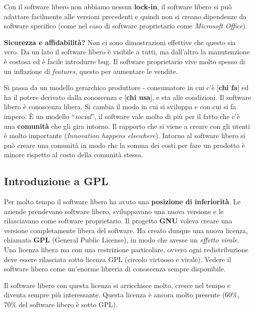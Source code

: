 Con il software libero non abbiamo nessun \textbf{lock-in}, il software libero si può adattare facilmente alle versioni precedenti e quindi non si creano dipendenze da software specifico (come nel caso di software proprietario come \textit{Microsoft Office}).

\textbf{Sicurezza e affidabilità?} Non ci sono dimostrazioni effettive che questo sia vero. Da un lato il software libero è visibile a tutti, ma dall'altro la manutenzione è costosa ed è facile introdurre bug. Il software proprietario vive molto spesso di un inflazione di \textit{features}, questo per aumentare le vendite.


Si passa da un modello gerarchico produttore - consumatore in cui c'è [\textbf{chi fa}] ed ha il potere derivato dalla conoscenza e [\textbf{chi usa}], e sta alle condizioni. Il software libero è conoscenza libera. Si cambia il modo in cui si sviluppa e con cui si fa impero. È un modello ``\textit{social}'', il software vale molto di più per il fatto che c'è una \textbf{comunità} che gli gira intorno. Il rapporto che si viene a creare con gli utenti è molto importante (\textit{Innovation happens elsewhere}). Intorno al software libero si può creare una comunità in modo che la somma dei costi per fare un prodotto è minore rispetto al costo della comunità stessa.

\subsection{Introduzione a GPL}

Per molto tempo il software libero ha avuto una \textbf{posizione di inferiorità}. Le aziende prendevano software libero, sviluppavano una nuova versione e le rilasciavano come software proprietario. Il progetto \textbf{GNU} voleva creare una versione completamente libera del software. Ha creato dunque una nuova licenza, chiamata \textbf{GPL} (General Public License), in modo che avesse un \textit{effetto virale}. Una licenza libera ma con una restrizione particolare, ovvero ogni redistribuzione deve essere rilasciata sotto licenza GPL (circolo virtuoso e virale). Vedere il software libero come un'enorme libreria di conoscenza sempre disponibile.

Il software libero con questa licenza si arricchisce molto, cresce nel tempo e diventa sempre più interessante. Questa licenza è ancora molto presente (60\%, 70\% del software libero è sotto GPL).